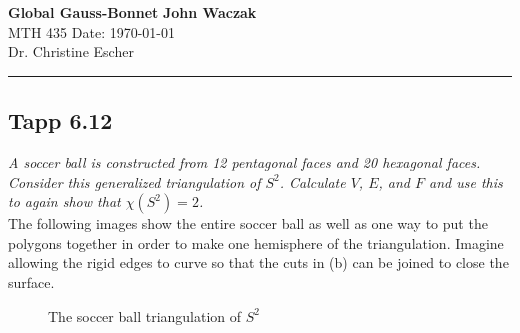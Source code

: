 \documentclass[a4paper, 11pt]{article}
\begin{document}
\noindent
\large\textbf{Global Gauss-Bonnet} \hfill \textbf{John Waczak} \\
\normalsize MTH 435 \hfill  Date: \today \\
Dr. Christine Escher \\
\par\noindent\rule{\textwidth}{0.4pt}	
	

\subsection*{Tapp 6.12}
	\textit{A soccer ball is constructed from 12 pentagonal faces and 20 hexagonal faces. Consider this generalized triangulation of $S^2$. Calculate $V$, $E$, and $F$ and use this to again show that $\chi(S^2)=2$. }\\

	

	\noindent The following images show the entire soccer ball as well as one way to put the polygons together in order to make one hemisphere of the triangulation. Imagine allowing the rigid edges to curve so that the cuts in (b) can be joined to close the surface. 
		\begin{figure}[!hbt]
			\centering
			\quad
			\caption{The soccer ball triangulation of $S^2$} 
			\label{fig:soccerBall}
		\end{figure}
	
\end{document}
